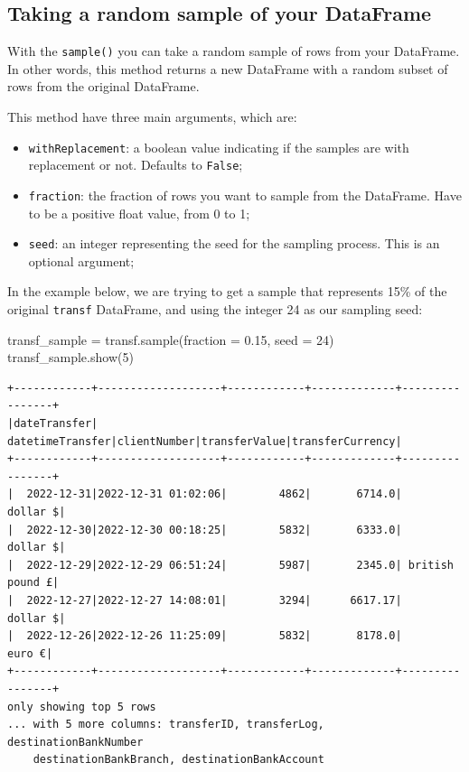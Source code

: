 \documentclass[
  11pt,
  letterpaper,
  DIV=11,
  numbers=noendperiod]{scrreprt}
\newenvironment{Shaded}{\begin{snugshade}}{\end{snugshade}}
\newcommand{\DecValTok}[1]{\textcolor[rgb]{0.68,0.00,0.00}{#1}}
\newcommand{\FloatTok}[1]{\textcolor[rgb]{0.68,0.00,0.00}{#1}}
\newcommand{\NormalTok}[1]{\textcolor[rgb]{0.00,0.23,0.31}{#1}}
\newcommand{\OperatorTok}[1]{\textcolor[rgb]{0.37,0.37,0.37}{#1}}
\providecommand{\tightlist}{%
  \setlength{\itemsep}{0pt}\setlength{\parskip}{0pt}}\usepackage{longtable,booktabs,array}
\begin{document}
\hypertarget{taking-a-random-sample-of-your-dataframe}{%
\subsection{Taking a random sample of your
DataFrame}\label{taking-a-random-sample-of-your-dataframe}}

With the \texttt{sample()} you can take a random sample of rows from
your DataFrame. In other words, this method returns a new DataFrame with
a random subset of rows from the original DataFrame.

This method have three main arguments, which are:

\begin{itemize}
\tightlist
\item
  \texttt{withReplacement}: a boolean value indicating if the samples
  are with replacement or not. Defaults to \texttt{False};
\item
  \texttt{fraction}: the fraction of rows you want to sample from the
  DataFrame. Have to be a positive float value, from 0 to 1;
\item
  \texttt{seed}: an integer representing the seed for the sampling
  process. This is an optional argument;
\end{itemize}

In the example below, we are trying to get a sample that represents 15\%
of the original \texttt{transf} DataFrame, and using the integer 24 as
our sampling seed:

\begin{Shaded}
\begin{Highlighting}[]
\NormalTok{transf\_sample }\OperatorTok{=}\NormalTok{ transf.sample(fraction }\OperatorTok{=} \FloatTok{0.15}\NormalTok{, seed }\OperatorTok{=} \DecValTok{24}\NormalTok{)}
\NormalTok{transf\_sample.show(}\DecValTok{5}\NormalTok{)}
\end{Highlighting}
\end{Shaded}

\begin{verbatim}
+------------+-------------------+------------+-------------+----------------+
|dateTransfer|   datetimeTransfer|clientNumber|transferValue|transferCurrency|
+------------+-------------------+------------+-------------+----------------+
|  2022-12-31|2022-12-31 01:02:06|        4862|       6714.0|        dollar $|
|  2022-12-30|2022-12-30 00:18:25|        5832|       6333.0|        dollar $|
|  2022-12-29|2022-12-29 06:51:24|        5987|       2345.0| british pound £|
|  2022-12-27|2022-12-27 14:08:01|        3294|      6617.17|        dollar $|
|  2022-12-26|2022-12-26 11:25:09|        5832|       8178.0|          euro €|
+------------+-------------------+------------+-------------+----------------+
only showing top 5 rows
... with 5 more columns: transferID, transferLog, destinationBankNumber
    destinationBankBranch, destinationBankAccount
\end{verbatim}
\end{document}
